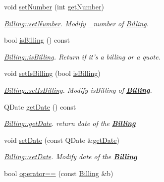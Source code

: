 \begin{DoxyCompactItemize}
void \hyperlink{classBilling_a1178eab66407b0761c35a13d8da84cdb}{set\+Number} (int \hyperlink{classBilling_a23a9446aef6af58bcfa698b76cc24731}{get\+Number})
\begin{DoxyCompactList}\small\item\em \hyperlink{classBilling_a1178eab66407b0761c35a13d8da84cdb}{Billing\+::set\+Number}. Modify {\itshape \+\_\+number} of \hyperlink{classBilling}{Billing}. \end{DoxyCompactList}\item 
bool \hyperlink{classBilling_ad616bbb5664e0ba2bac6982f06a7c723}{is\+Billing} () const 
\begin{DoxyCompactList}\small\item\em \hyperlink{classBilling_ad616bbb5664e0ba2bac6982f06a7c723}{Billing\+::is\+Billing}. Return if it's a billing or a quote. \end{DoxyCompactList}\item 
void \hyperlink{classBilling_a81a3b85e0e051239521b4e3d93f297c2}{set\+Is\+Billing} (bool \hyperlink{classBilling_ad616bbb5664e0ba2bac6982f06a7c723}{is\+Billing})
\begin{DoxyCompactList}\small\item\em \hyperlink{classBilling_a81a3b85e0e051239521b4e3d93f297c2}{Billing\+::set\+Is\+Billing}. Modify {\itshape is\+Billing} of {\bfseries \hyperlink{classBilling}{Billing}}. \end{DoxyCompactList}\item 
Q\+Date \hyperlink{classBilling_ad3657e1cdf05613cfca4b22b62976213}{get\+Date} () const 
\begin{DoxyCompactList}\small\item\em \hyperlink{classBilling_ad3657e1cdf05613cfca4b22b62976213}{Billing\+::get\+Date}. return date of the {\bfseries \hyperlink{classBilling}{Billing}} \end{DoxyCompactList}\item 
void \hyperlink{classBilling_ad1cb89772dc12335543ff7d422d18bd4}{set\+Date} (const Q\+Date \&\hyperlink{classBilling_ad3657e1cdf05613cfca4b22b62976213}{get\+Date})
\begin{DoxyCompactList}\small\item\em \hyperlink{classBilling_ad1cb89772dc12335543ff7d422d18bd4}{Billing\+::set\+Date}. Modify {\itshape date} of the {\bfseries \hyperlink{classBilling}{Billing}} \end{DoxyCompactList}\item 
bool \hyperlink{classBilling_a2c045c4fa6064aa1b8dfeff6ddcc03a9}{operator==} (const \hyperlink{classBilling}{Billing} \&b)

\end{DoxyCompactItemize}
